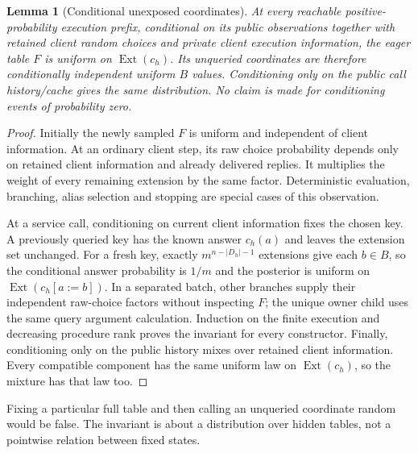 \documentclass[11pt,a4paper]{article}
\newtheorem{lemma}[theorem]{Lemma}
\theoremstyle{definition}
\begin{document}
\begin{lemma}[Conditional unexposed coordinates]
At every reachable positive-probability execution prefix, conditional on
its public observations together with retained client random choices
and private client execution information, the eager table $F$ is uniform
on $\operatorname{Ext}(c_h)$. Its unqueried coordinates are therefore
conditionally independent uniform $B$ values. Conditioning only on the
public call history/cache gives the same distribution. No claim is made
for conditioning events of probability zero.
\end{lemma}
\begin{proof}
Initially the newly sampled $F$ is uniform and independent of client
information. At an ordinary client step, its raw choice probability
depends only on retained client information and already delivered replies.
It multiplies the weight of every remaining extension by the same factor.
Deterministic evaluation, branching, alias selection and stopping are
special cases of this observation.

At a service call, conditioning on current client information fixes the
chosen key. A previously queried key has the known answer $c_h(a)$ and
leaves the extension set unchanged. For a fresh key, exactly
$m^{n-|D_h|-1}$ extensions give each $b\in B$, so the conditional answer
probability is $1/m$ and the posterior is uniform on
$\operatorname{Ext}(c_h[a:=b])$. In a separated batch, other branches
supply their independent raw-choice factors without inspecting $F$;
the unique owner child uses the same query argument calculation.
Induction on the finite execution and decreasing procedure rank proves
the invariant for every constructor. Finally, conditioning only on the
public history mixes over retained client information. Every compatible
component has the same uniform law on $\operatorname{Ext}(c_h)$, so
the mixture has that law too.
\end{proof}
Fixing a particular full table and then calling an unqueried coordinate
random would be false. The invariant is about a distribution over hidden
tables, not a pointwise relation between fixed states.
\end{document}

